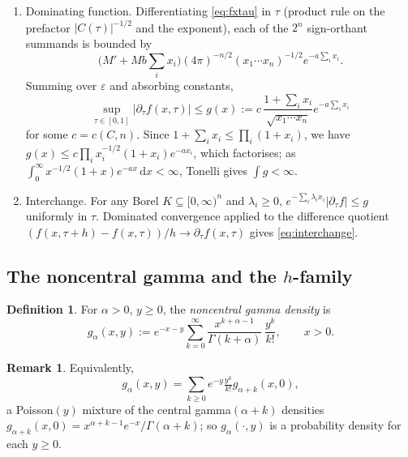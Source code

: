 \documentclass[12pt,a4paper]{article}
\makeatletter
\theoremstyle{definition}
\newtheorem{definition}[theorem]{Definition}
\newtheorem{remark}[theorem]{Remark}
\renewenvironment{proof}[1][\proofname]{\par
  \pushQED{\qed}%
  \normalfont \topsep6\p@\@plus6\p@\relax
  \trivlist
  \item[\hskip\labelsep\bfseries #1\@addpunct{.}]\ignorespaces
}{%
  \popQED\endtrivlist\@endpefalse
}
\newcommand{\dd}{\mathrm{d}}
\makeatother
\begin{document}
\begin{proof}
\begin{enumerate}[label=(\roman*)]
\begin{enumerate}
        \item Dominating function.  Differentiating \eqref{eq:fxtau}
          in $\tau$ (product rule on the prefactor $|C(\tau)|^{-1/2}$
          and the exponent), each of the $2^n$ sign-orthant summands
          is bounded by
          \[
            \bigl(M'+Mb\textstyle\sum_ix_i\bigr)
            (4\pi)^{-n/2}(x_1\cdots x_n)^{-1/2}e^{-a\sum_ix_i}.
          \]
          Summing over $\varepsilon$ and absorbing constants,
          \[
            \sup_{\tau\in[0,1]}|\partial_\tau f(x,\tau)|
            \leqslant g(x):=c\,\frac{1+\sum_ix_i}{\sqrt{x_1\cdots x_n}}
            e^{-a\sum_ix_i}
          \]
          for some $c=c(C,n)$.  Since $1+\sum_ix_i\leqslant\prod_i(1+x_i)$,
          we have $g(x)\leqslant c\prod_i x_i^{-1/2}(1+x_i)e^{-ax_i}$,
          which factorises; as $\int_0^\infty x^{-1/2}(1+x)e^{-ax}\,\dd x<\infty$,
          Tonelli gives $\int g<\infty$.

        \item Interchange.  For any Borel $K\subseteq[0,\infty)^n$ and
          $\lambda_i\geqslant 0$,
          $e^{-\sum_i\lambda_ix_i}|\partial_\tau f|\leqslant g$
          uniformly in $\tau$.  Dominated convergence applied to the
          difference quotient
          $(f(x,\tau+h)-f(x,\tau))/h\to\partial_\tau f(x,\tau)$ gives
          \eqref{eq:interchange}.
      \end{enumerate}
  \end{enumerate}
\end{proof}


\subsection{The noncentral gamma and the \texorpdfstring{$h$}{h}-family}

\begin{definition}\label{def:ncgamma}
  For $\alpha>0$, $y\geqslant 0$, the \emph{noncentral gamma density} is
  \[
    g_\alpha(x,y)
    :=e^{-x-y}\sum_{k=0}^\infty
    \frac{x^{k+\alpha-1}}{\Gamma(k+\alpha)}\,\frac{y^k}{k!},
    \qquad x>0.
  \]
\end{definition}

\begin{remark}\label{rem:ncgamma_poisson}
  Equivalently,
  \[
    g_\alpha(x,y)=\sum_{k\geqslant 0}e^{-y}\tfrac{y^k}{k!}g_{\alpha+k}(x,0),
  \]
  a Poisson$(y)$ mixture of the central gamma$(\alpha+k)$ densities
  $g_{\alpha+k}(x,0)=x^{\alpha+k-1}e^{-x}/\Gamma(\alpha+k)$; so
  $g_\alpha(\cdot,y)$ is a probability density for each $y\geqslant 0$.
\end{remark}
\end{document}
